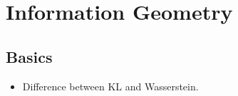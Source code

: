\chapter{Information Geometry}\label{ch:information_geometry}

\section{Basics}

\begin{itemize}
    \item Difference between KL and Wasserstein.
\end{itemize}